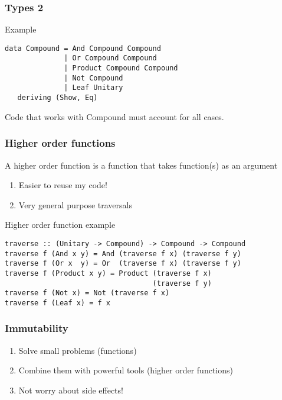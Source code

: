 \documentclass[compress]{beamer}
\begin{document}
\begin{frame}[fragile]
\frametitle{Types 2}
\begin{block}{Example}
\begin{lstlisting}
data Compound = And Compound Compound
              | Or Compound Compound
              | Product Compound Compound
              | Not Compound
              | Leaf Unitary
   deriving (Show, Eq)
\end{lstlisting}
\end{block}

Code that works with Compound must account for all cases.
\end{frame}


\begin{frame}
\frametitle{Higher order functions}

A higher order function is a function that takes function(s)
as an argument

\begin{enumerate}
\item Easier to reuse my code!
\item Very general purpose traversals
\end{enumerate}

\end{frame}

\begin{frame}[fragile]

\begin{block}{Higher order function example}
\begin{lstlisting}
traverse :: (Unitary -> Compound) -> Compound -> Compound
traverse f (And x y) = And (traverse f x) (traverse f y)
traverse f (Or x  y) = Or  (traverse f x) (traverse f y)
traverse f (Product x y) = Product (traverse f x)
                                   (traverse f y)
traverse f (Not x) = Not (traverse f x)
traverse f (Leaf x) = f x
\end{lstlisting}
\end{block}
\end{frame}

\begin{frame}
\frametitle{Immutability}
\begin{enumerate}
\item Solve small problems (functions)
\item Combine them with powerful tools (higher order functions)
\item Not worry about side effects!
\end{enumerate}

\end{frame}
\end{document}
